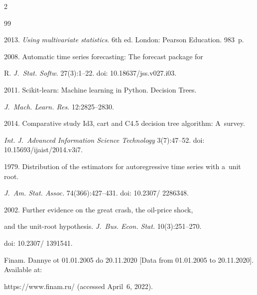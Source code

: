 \begin{multicols}{2}
{{\begin{thebibliography}{99}


2013. \textit{Using multivariate statistics}. 6th ed. London: Pearson Education. 983~p.


 2008. Automatic time series forecasting: The forecast package for 

R. \textit{J.~Stat. Softw.} 27(3):1--22. doi: 10.18637/jss.v027.i03.



 2011. Scikit-learn: Machine learning in Python. Decision Trees. 

 \textit{J.~Mach. Learn. Res.} 12:2825--2830.



 2014. Comparative study Id3, cart and C4.5 decision tree algorithm: A~survey. 

 \textit{Int. J.~Advanced Information Science Technology} 3(7):47--52. doi: 10.15693/ijaist/2014.v3i7.






 1979. Distribution of the estimators for autoregressive time series with a~unit root. 

 \textit{J.~Am. Stat. Assoc.} 74(366):427--431. doi: 10.2307/ 2286348.


 2002. Further evidence on the great crash, the oil-price shock,

 and the unit-root hypothesis. \textit{J.~Bus. Econ. Stat.} 10(3):251--270. 

 doi: 10.2307/ 1391541.


Finam. Dannye ot 01.01.2005 do 20.11.2020 [Data from 01.01.2005 to 20.11.2020]. Available at: 

{\sf https://www.\linebreak finam.ru/} (accessed April~6, 2022). 


\end{thebibliography}}}
\end{multicols}
